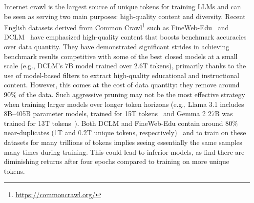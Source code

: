 \documentclass[11pt]{article}
\newcommand{\DCLM}{\textsc{DCLM}\xspace}
\begin{document}
Internet crawl is the largest source of unique tokens for training LLMs and can be seen as serving two main purposes: high-quality content and diversity.  Recent English datasets derived from Common Crawl\footnote{\url{https://commoncrawl.org/}} such as FineWeb-Edu~\citep{penedo2024fineweb} and \DCLM~\citep{li2024datacomp} have emphasized high-quality content that boosts benchmark accuracies over data quantity. They have demonstrated significant strides in achieving benchmark results competitive with some of the best closed models at a small scale (e.g., DCLM's 7B model trained over 2.6T tokens), primarily thanks to the use of model-based filters to extract high-quality educational and instructional content. However, this comes at the cost of data quantity: they remove around $90\%$ of the data.
Such aggressive pruning may not be the most effective strategy when training larger models over longer token horizons (e.g., Llama 3.1 includes 8B--405B parameter models, trained for 15T tokens~\citep{dubey2024llama} and Gemma 2 27B was trained for 13T tokens~\citep{team2024gemma}).
Both \DCLM and FineWeb-Edu contain around $80\%$ near-duplicates (1T and 0.2T unique tokens, respectively)~\citep{fineweb-edu-discussion,li2024datacomp} and to train on these datasets for many trillions of tokens implies seeing essentially the same samples many times during training. This could lead to inferior models, as \citet{muennighoff2024scaling} find there are diminishing returns after four epochs compared to training on more unique tokens.
\end{document}
